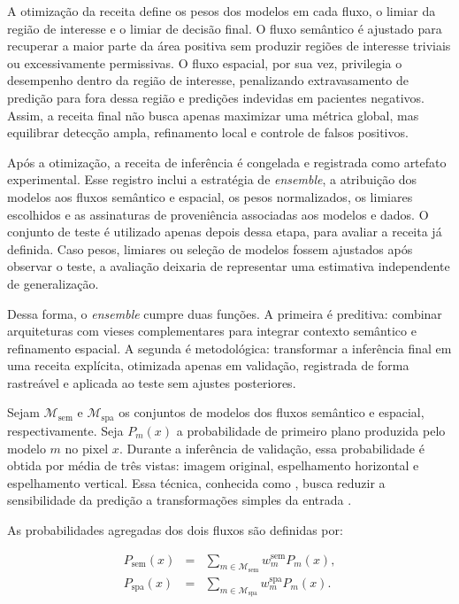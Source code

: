 A otimização da receita define os pesos dos modelos em cada fluxo, o limiar da
região de interesse e o limiar de decisão final. O fluxo semântico é ajustado
para recuperar a maior parte da área positiva sem produzir regiões de interesse
triviais ou excessivamente permissivas. O fluxo espacial, por sua vez, privilegia
o desempenho dentro da região de interesse, penalizando extravasamento de
predição para fora dessa região e predições indevidas em pacientes negativos.
Assim, a receita final não busca apenas maximizar uma métrica global, mas
equilibrar detecção ampla, refinamento local e controle de falsos positivos.

Após a otimização, a receita de inferência é congelada e registrada como
artefato experimental. Esse registro inclui a estratégia de \textit{ensemble}, a
atribuição dos modelos aos fluxos semântico e espacial, os pesos normalizados,
os limiares escolhidos e as assinaturas de proveniência associadas aos modelos e
dados. O conjunto de teste é utilizado apenas depois dessa etapa, para avaliar a
receita já definida. Caso pesos, limiares ou seleção de modelos fossem ajustados
após observar o teste, a avaliação deixaria de representar uma estimativa
independente de generalização.

Dessa forma, o \textit{ensemble} cumpre duas funções. A primeira é preditiva:
combinar arquiteturas com vieses complementares para integrar contexto semântico
e refinamento espacial. A segunda é metodológica: transformar a inferência final
em uma receita explícita, otimizada apenas em validação, registrada de forma
rastreável e aplicada ao teste sem ajustes posteriores.

Sejam $\mathcal{M}_{\mathrm{sem}}$ e $\mathcal{M}_{\mathrm{spa}}$ os conjuntos de
modelos dos fluxos semântico e espacial, respectivamente. Seja $P_m(x)$ a
probabilidade de primeiro plano produzida pelo modelo $m$ no pixel $x$. Durante
a inferência de validação, essa probabilidade é obtida por média de três vistas:
imagem original, espelhamento horizontal e espelhamento vertical. Essa técnica, conhecida como , busca reduzir a sensibilidade da predição a
transformações simples da entrada \cite{moshkov2020test}. 

As probabilidades
agregadas dos dois fluxos são definidas por:

\begin{equation}
\begin{array}{rcl}
P_{\mathrm{sem}}(x) &=&
\sum_{m\in\mathcal{M}_{\mathrm{sem}}} w_m^{\mathrm{sem}}P_m(x),\\[0.6em]
P_{\mathrm{spa}}(x) &=&
\sum_{m\in\mathcal{M}_{\mathrm{spa}}} w_m^{\mathrm{spa}}P_m(x).
\end{array}
\label{eq:streams}
\end{equation}


